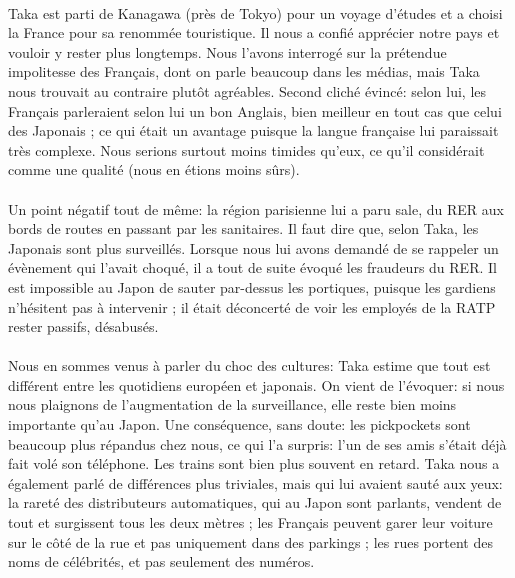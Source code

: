 \paragraph{} Taka est parti de Kanagawa (près de Tokyo) pour un voyage d'études
et a choisi la France pour sa renommée touristique. Il nous a confié apprécier
notre pays et vouloir y rester plus longtemps. Nous l'avons interrogé sur la
prétendue impolitesse des Français, dont on parle beaucoup dans les médias,
mais Taka nous trouvait au contraire plutôt agréables. Second cliché évincé:
selon lui, les Français parleraient selon lui un bon Anglais, bien meilleur en
tout cas  que celui des Japonais ; ce qui était un avantage puisque la langue
française lui paraissait très complexe. Nous serions surtout moins timides
qu'eux, ce qu'il considérait comme une qualité (nous en étions moins sûrs).

\paragraph{} Un point négatif tout de même: la région parisienne lui a paru
sale, du RER aux bords de routes en passant par les sanitaires. Il faut dire
que, selon Taka, les Japonais sont plus surveillés. Lorsque nous lui avons
demandé de se rappeler un évènement qui l'avait choqué, il a tout de suite
évoqué les fraudeurs du RER. Il est impossible au Japon de sauter par-dessus
les portiques, puisque les gardiens n'hésitent pas à intervenir ; il était
déconcerté de voir les employés de la RATP rester passifs, désabusés.

\paragraph{} Nous en sommes venus à parler du choc des cultures: Taka estime
que tout est différent entre les quotidiens européen et japonais. On vient de
l'évoquer: si nous nous plaignons de l'augmentation de la surveillance, elle
reste bien moins importante qu'au Japon. Une conséquence, sans doute: les
pickpockets sont beaucoup plus répandus chez nous, ce qui l'a surpris: l'un de
ses amis s'était déjà fait volé son téléphone. Les trains sont bien plus
souvent en retard. Taka nous a également parlé de différences plus triviales,
mais qui lui avaient sauté aux yeux: la rareté des distributeurs automatiques,
qui au Japon sont parlants, vendent de tout et surgissent tous les deux mètres
; les Français peuvent garer leur voiture sur le côté de la rue et pas
uniquement dans des parkings ; les rues portent des noms de célébrités, et pas
seulement des numéros.


